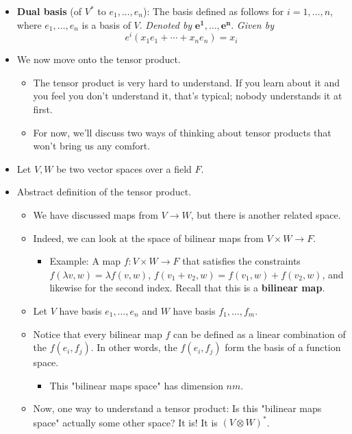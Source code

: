 \documentclass[../notes.tex]{subfiles}
\begin{document}
\begin{itemize}
    \item \textbf{Dual basis} (of $V^*$ to $e_1,\dots,e_n$): The basis defined as follows for $i=1,\dots,n$, where $e_1,\dots,e_n$ is a basis of $V$. \emph{Denoted by} $\bm{e^1,\ldots,e^n}$. \emph{Given by}
    \begin{equation*}
        e^i(x_1e_1+\cdots+x_ne_n) = x_i
    \end{equation*}
    \item We now move onto the tensor product.
    \begin{itemize}
        \item The tensor product is very hard to understand. If you learn about it and you feel you don't understand it, that's typical; nobody understands it at first.
        \item For now, we'll discuss two ways of thinking about tensor products that won't bring us any comfort.
    \end{itemize}
    \item Let $V,W$ be two vector spaces over a field $F$.
    \item Abstract definition of the tensor product.
    \begin{itemize}
        \item We have discussed maps from $V\to W$, but there is another related space.
        \item Indeed, we can look at the space of bilinear maps from $V\times W\to F$.
        \begin{itemize}
            \item Example: A map $f:V\times W\to F$ that satisfies the constraints $f(\lambda v,w)=\lambda f(v,w)$, $f(v_1+v_2,w)=f(v_1,w)+f(v_2,w)$, and likewise for the second index. Recall that this is a \textbf{bilinear map}.
        \end{itemize}
        \item Let $V$ have basis $e_1,\dots,e_n$ and $W$ have basis $f_1,\dots,f_m$.
        \item Notice that every bilinear map $f$ can be defined as a linear combination of the $f(e_i,f_j)$. In other words, the $f(e_i,f_j)$ form the basis of a function space.
        \begin{itemize}
            \item This "bilinear maps space" has dimension $nm$.
        \end{itemize}
        \item Now, one way to understand a tensor product: Is this "bilinear maps space" actually some other space? It is! It is $(V\otimes W)^*$.

\end{itemize}
\end{itemize}
\end{document}
